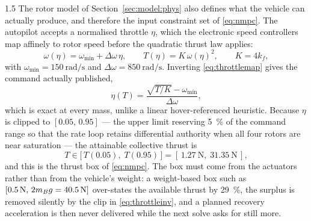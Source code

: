 \begin{spacing}{1.5}
The rotor model of Section~\ref{sec:model:phys} also defines what the vehicle can
actually produce, and therefore the input constraint set of \eqref{eq:nmpc}. The
autopilot accepts a normalised throttle $\eta$, which the electronic speed
controllers map affinely to rotor speed before the quadratic thrust law applies:
\begin{equation}
\omega(\eta) = \omega_{\min} + \Delta\omega\,\eta,
\qquad
T(\eta) = K\,\omega(\eta)^2,
\qquad K = 4k_f ,
\label{eq:throttlemap}
\end{equation}
with $\omega_{\min}=\SI{150}{\radian\per\second}$ and
$\Delta\omega=\SI{850}{\radian\per\second}$. Inverting \eqref{eq:throttlemap}
gives the command actually published,
\begin{equation}
\eta(T) = \frac{\sqrt{T/K}-\omega_{\min}}{\Delta\omega},
\label{eq:throttleinv}
\end{equation}
which is exact at every mass, unlike a linear hover-referenced heuristic.
Because $\eta$ is clipped to $[0.05,\,0.95]$ --- the upper limit reserving
\SI{5}{\percent} of the command range so that the rate loop retains differential
authority when all four rotors are near saturation --- the attainable collective
thrust is
\begin{equation}
T \in \bigl[\,T(0.05),\; T(0.95)\,\bigr] = [\,\SI{1.27}{\newton},\; \SI{31.35}{\newton}\,],
\label{eq:envelope}
\end{equation}
and this is the thrust box of \eqref{eq:nmpc}. The box must come from the
actuators rather than from the vehicle's weight: a weight-based box such as
$[\SI{0.5}{\newton},\,2m_B g=\SI{40.5}{\newton}]$ over-states the available
thrust by \SI{29}{\percent}, the surplus is removed silently by the clip in
\eqref{eq:throttleinv}, and a planned recovery acceleration is then never
delivered while the next solve asks for still more.


\end{spacing}
